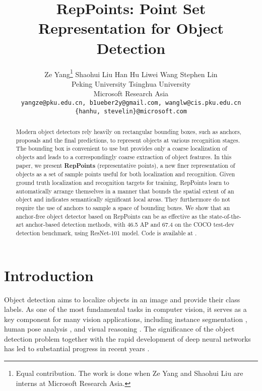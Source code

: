 \documentclass[10pt,twocolumn,letterpaper]{article}
\begin{document}
\title{RepPoints: Point Set Representation for Object Detection}

\author{Ze Yang\thanks{Equal contribution. The work is done when Ze Yang and Shaohui Liu are interns at Microsoft Research Asia.} \quad Shaohui Liu \quad Han Hu \quad Liwei Wang \quad Stephen Lin\\
    Peking University \quad 
    Tsinghua University\\
	Microsoft Research Asia \\
	{\tt\small yangze@pku.edu.cn, b1ueber2y@gmail.com, wanglw@cis.pku.edu.cn} \\
	{\tt\small\{hanhu, stevelin\}@microsoft.com} \\
}

\maketitle


\begin{abstract}
   
Modern object detectors rely heavily on rectangular bounding boxes, such as anchors, proposals and the final predictions, to represent objects at various recognition stages. The bounding box is convenient to use but provides only a coarse localization of objects and leads to a correspondingly coarse extraction of object features. In this paper, we present \textbf{RepPoints} (representative points), a new finer representation of objects as a set of sample points useful for both localization and recognition. Given ground truth localization and recognition targets for training, RepPoints learn to automatically arrange themselves in a manner that bounds the spatial extent of an object and indicates semantically significant local areas. They furthermore do not require the use of anchors to sample a space of bounding boxes. We show that an anchor-free object detector based on RepPoints can be as effective as the state-of-the-art anchor-based detection methods, with 46.5 AP and 67.4  on the COCO test-dev detection benchmark, using ResNet-101 model. Code is available at \href{https://github.com/microsoft/RepPoints}{\color{cyan}{https://github.com/microsoft/RepPoints}}.

 \end{abstract}

\section{Introduction}
Object detection aims to localize objects in an image and provide their class labels. As one of the most fundamental tasks in computer vision, it serves as a key component for many vision applications, including instance segmentation \cite{pinheiro2015learning}, human pose analysis \cite{toshev2014deeppose}, and visual reasoning \cite{wu2017learning}. The significance of the object detection problem together with the rapid development of deep neural networks has led to substantial progress in recent years \cite{erhan2014scalable,girshick2014rich,girshick2015fast,ren2015faster,he2015spatial,dai2016r}. 
\end{document}
